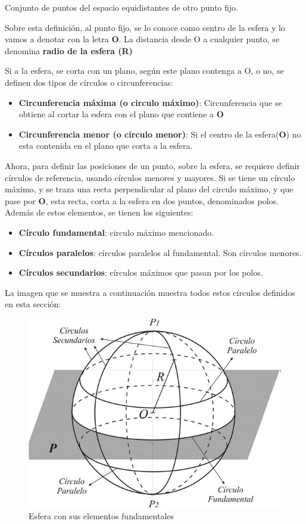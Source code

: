 \begin{defin_esphere}
		 Conjunto de puntos del espacio equidistantes de otro punto fijo. 
\end{defin_esphere} 

Sobre esta definición, al punto fijo, se lo conoce como centro de la esfera y lo vamos a denotar con la letra \textbf{O}. La distancia desde O a cualquier punto, se denomina  \textbf{radio de la esfera (R)}  

Si a la esfera, se corta con un plano, según este plano contenga a O, o no, se definen dos tipos de círculos o circunferencias: 
\begin{itemize}
	\item \textbf{Circunferencia máxima (o circulo máximo)}: Circunferencia que se obtiene al cortar la esfera con el plano que contiene a \textbf{O}
	\item \textbf{Circunferencia menor (o circulo menor)}: Si el centro de la esfera(\textbf{O}) no esta contenida en el plano que corta a la esfera.
\end{itemize}

Ahora, para definir las posiciones de un punto, sobre la esfera, se requiere definir círculos de referencia, usando círculos menores y mayores. Si se tiene un círculo máximo, y se traza una recta perpendicular al plano del circulo máximo, y que pase por \textbf{O}, esta recta, corta a la esfera en dos puntos, denominados polos. Además de estos elementos, se tienen los siguientes: 
\begin{itemize}
	\item \textbf{Círculo fundamental}: circulo máximo mencionado. 
	\item \textbf{Círculos paralelos}: círculos paralelos al fundamental. Son círculos menores. 
	\item \textbf{Círculos secundarios}: círculos máximos que pasan por los polos. 
\end{itemize}

La imagen que se muestra a continuación muestra todos estos círculos definidos en esta sección:
\begin{figure}[ht!]
	\centering
	\includegraphics[scale=0.7]{circulos_fundamentales} 
	\caption{Esfera con sus elementos fundamentales}
	\label{fig:circ_fund}
\end{figure}

